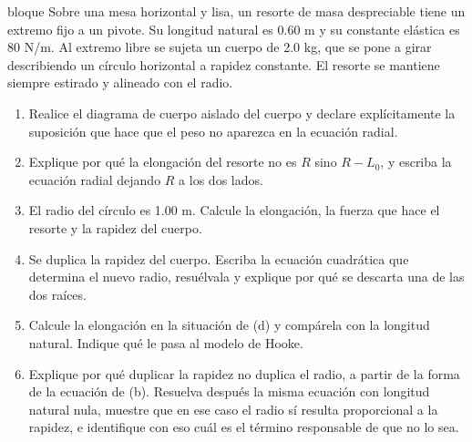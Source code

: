\documentclass[11pt,openany]{book}
\begin{document}
\begin{ejercicio}{bloque}
Sobre una mesa horizontal y lisa, un resorte de masa despreciable tiene un extremo fijo a un pivote. Su longitud natural es 0.60 m y su constante elástica es 80 N/m. Al extremo libre se sujeta un cuerpo de 2.0 kg, que se pone a girar describiendo un círculo horizontal a rapidez constante. El resorte se mantiene siempre estirado y alineado con el radio.
\begin{enumerate}[label=(\alph*), leftmargin=1.7em, itemsep=1pt, topsep=3pt]
  \item Realice el diagrama de cuerpo aislado del cuerpo y declare explícitamente la suposición que hace que el peso no aparezca en la ecuación radial.
  \item Explique por qué la elongación del resorte no es $R$ sino $R - L_0$, y escriba la ecuación radial dejando $R$ a los dos lados.
  \item El radio del círculo es 1.00 m. Calcule la elongación, la fuerza que hace el resorte y la rapidez del cuerpo.
  \item Se duplica la rapidez del cuerpo. Escriba la ecuación cuadrática que determina el nuevo radio, resuélvala y explique por qué se descarta una de las dos raíces.
  \item Calcule la elongación en la situación de (d) y compárela con la longitud natural. Indique qué le pasa al modelo de Hooke.
  \item Explique por qué duplicar la rapidez no duplica el radio, a partir de la forma de la ecuación de (b). Resuelva después la misma ecuación con longitud natural nula, muestre que en ese caso el radio sí resulta proporcional a la rapidez, e identifique con eso cuál es el término responsable de que no lo sea.
\end{enumerate}
\end{ejercicio}
\end{document}
